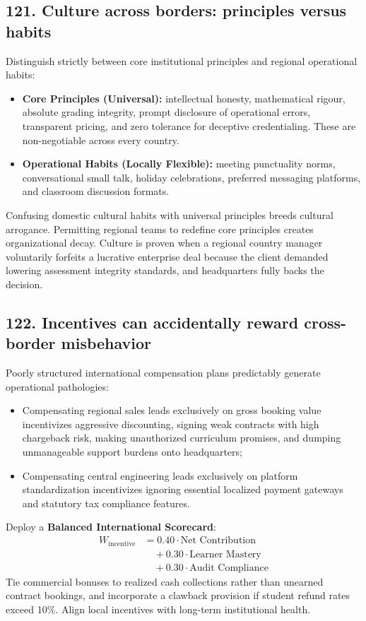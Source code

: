 \subsection{121. Culture across borders: principles versus habits}

Distinguish strictly between core institutional principles and regional operational habits:
\begin{itemize}
    \item \textbf{Core Principles (Universal):} intellectual honesty, mathematical rigour, absolute grading integrity, prompt disclosure of operational errors, transparent pricing, and zero tolerance for deceptive credentialing. These are non-negotiable across every country.
    \item \textbf{Operational Habits (Locally Flexible):} meeting punctuality norms, conversational small talk, holiday celebrations, preferred messaging platforms, and classroom discussion formats.
\end{itemize}
Confusing domestic cultural habits with universal principles breeds cultural arrogance. Permitting regional teams to redefine core principles creates organizational decay. Culture is proven when a regional country manager voluntarily forfeits a lucrative enterprise deal because the client demanded lowering assessment integrity standards, and headquarters fully backs the decision.

\subsection{122. Incentives can accidentally reward cross-border misbehavior}

Poorly structured international compensation plans predictably generate operational pathologies:
\begin{itemize}
    \item Compensating regional sales leads exclusively on gross booking value incentivizes aggressive discounting, signing weak contracts with high chargeback risk, making unauthorized curriculum promises, and dumping unmanageable support burdens onto headquarters;
    \item Compensating central engineering leads exclusively on platform standardization incentivizes ignoring essential localized payment gateways and statutory tax compliance features.
\end{itemize}

Deploy a \textbf{Balanced International Scorecard}:
\begin{equation}
\begin{aligned}
W_{\text{incentive}} &= 0.40 \cdot \text{Net Contribution} \\
&\quad + 0.30 \cdot \text{Learner Mastery} \\
&\quad + 0.30 \cdot \text{Audit Compliance}
\end{aligned}
\end{equation}
Tie commercial bonuses to realized cash collections rather than unearned contract bookings, and incorporate a clawback provision if student refund rates exceed 10\%. Align local incentives with long-term institutional health.

